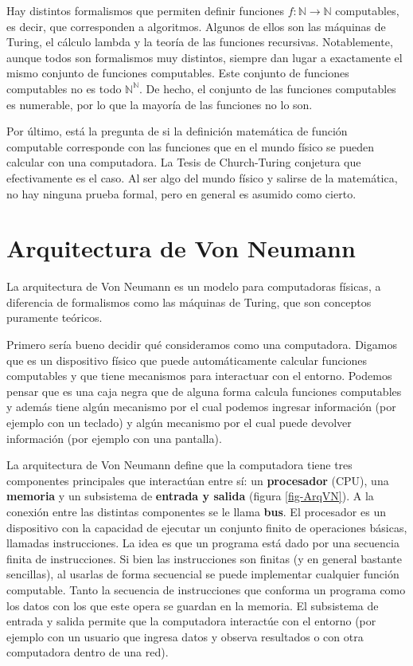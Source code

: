\documentclass[a4paper, 12pt]{report}
\newcommand{\N}{\mathbb{N}}
\theoremstyle{definition}
\begin{document}
Hay distintos formalismos que permiten definir funciones $f:\N\to\N$ computables, es decir, que corresponden a algoritmos. Algunos de ellos son las máquinas de Turing, el cálculo lambda y la teoría de las funciones recursivas. Notablemente, aunque todos son formalismos muy distintos, siempre dan lugar a exactamente el mismo conjunto de funciones computables. Este conjunto de funciones computables no es todo $\N^\N$. De hecho, el conjunto de las funciones computables es numerable, por lo que la mayoría de las funciones no lo son.

Por último, está la pregunta de si la definición matemática de función computable corresponde con las funciones que en el mundo físico se pueden calcular con una computadora. La Tesis de Church-Turing conjetura que efectivamente es el caso. Al ser algo del mundo físico y salirse de la matemática, no hay ninguna prueba formal, pero en general es asumido como cierto.


\section{Arquitectura de Von Neumann}\label{sec-ArqVonNeu}

La arquitectura de Von Neumann es un modelo para computadoras físicas, a diferencia de formalismos como las máquinas de Turing, que son conceptos puramente teóricos.

Primero sería bueno decidir qué consideramos como una computadora. Digamos que es un dispositivo físico que puede automáticamente calcular funciones computables y que tiene mecanismos para interactuar con el entorno. Podemos pensar que es una caja negra que de alguna forma calcula funciones computables y además tiene algún mecanismo por el cual podemos ingresar información (por ejemplo con un teclado) y algún mecanismo por el cual puede devolver información (por ejemplo con una pantalla).

La arquitectura de Von Neumann define que la computadora tiene tres componentes principales que interactúan entre sí: un {\bf procesador }(CPU), una {\bf memoria} y un subsistema de {\bf entrada y salida} (figura \ref{fig-ArqVN}). A la conexión entre las distintas componentes se le llama {\bf bus}. El procesador es un dispositivo con la capacidad de ejecutar un conjunto finito de operaciones básicas, llamadas  instrucciones. La idea es que un programa está dado por una secuencia finita de instrucciones. Si bien las instrucciones son finitas (y en general bastante sencillas), al usarlas de forma secuencial se puede implementar cualquier función computable. Tanto la secuencia de instrucciones que conforma un programa como los datos con los que este opera se guardan en la memoria. El subsistema de entrada y salida permite que la computadora interactúe con el entorno (por ejemplo con un usuario que ingresa datos y observa resultados o con otra computadora dentro de una red).
\end{document}
